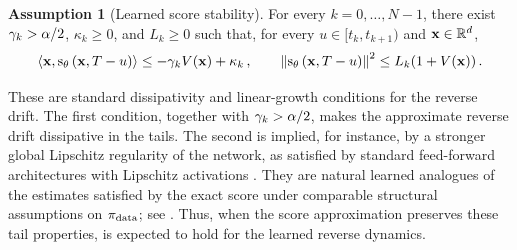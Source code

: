 \documentclass[11pt]{article}
\theoremstyle{plain}
\theoremstyle{definition}
\newtheorem{assumption}[theorem]{Assumption}
\theoremstyle{remark}
\begin{document}

\begin{assumption}[Learned score stability]
\label{ass:dissipative_score_main}
For every $k=0,\ldots,N-1$, there exist $\gamma_k>\alpha/2$, $\kappa_k\ge0$, and $L_k\ge0$ such that, for every $u\in[t_k,t_{k+1})$ and $\mathbf{x}\in\mathbb{R}^d$,
\begin{equation}
\label{eq:learned_score_conditions_main}
\dotprod{\x}{\scorenet[T-u][\x][\theta]} \le -\gamma_k V(\x)+\kappa_k \eqsp, \qquad \normEc{\scorenet[T-u][\x][\theta]}^2 \le L_k(1+V(\x)) \eqsp.
\end{equation}
\end{assumption}

These are standard dissipativity and linear-growth conditions for the
reverse drift. The first condition, together with $\gamma_k>\alpha/2$, makes the approximate reverse drift dissipative in the tails. The second is implied, for instance, by a stronger global Lipschitz regularity of the network, as satisfied by standard feed-forward architectures with Lipschitz activations \citep{virmaux2018lipschitz}. They are natural learned analogues of the estimates satisfied by the exact score under comparable structural assumptions on $\pi_{\mathrm{data}}$; see \citet{strasman2026forgetting}. Thus, when the score approximation preserves these tail properties,  is expected to hold for the learned reverse dynamics. 
\end{document}
